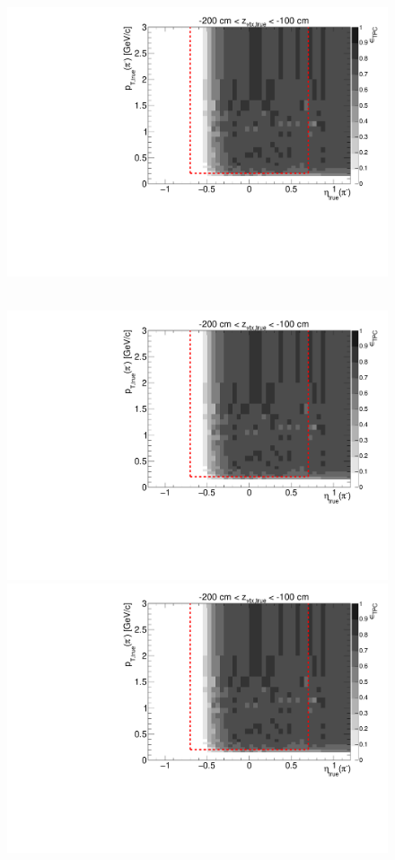\begin{figure}[hb]
{  \includegraphics[width=\linewidth,page=17]{graphics/eff/Eff2D_TPC_pion_Minus.pdf}
}~
\parbox{0.495\textwidth}{
  \centering
  \includegraphics[width=\linewidth,page=12]{graphics/eff/Eff2D_TPC_pion_Minus.pdf}\\
  \includegraphics[width=\linewidth,page=14]{graphics/eff/Eff2D_TPC_pion_Minus.pdf}\\
}
\end{figure}
